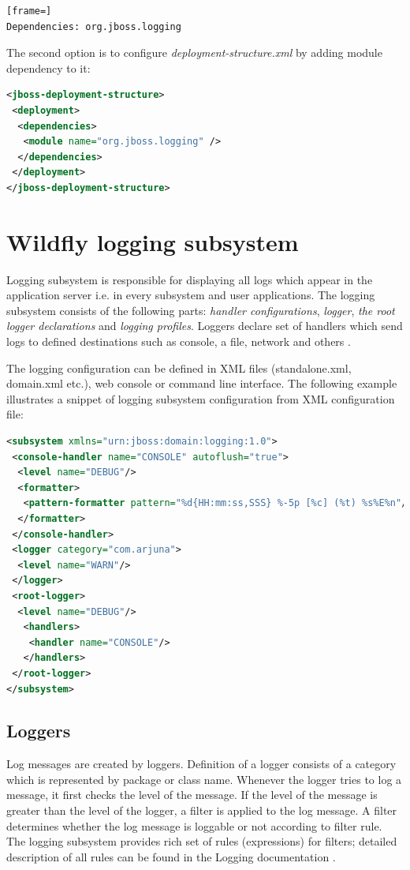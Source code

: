 \documentclass[12pt,oneside]{fithesis2}
\begin{document}
\begin{lstlisting}[frame=]
Dependencies: org.jboss.logging
\end{lstlisting}

\newpage
The second option is to configure \textit{deployment-structure.xml} by adding module dependency to it:

\begin{lstlisting}[caption = Configuring deployment structure file, label = dynamic_module_descriptor, language=XML]
<jboss-deployment-structure>
 <deployment>
  <dependencies>
   <module name="org.jboss.logging" />
  </dependencies>
 </deployment>
</jboss-deployment-structure>
\end{lstlisting}

\section{Wildfly logging subsystem}
\label{wildfly_logging}
Logging subsystem is responsible for displaying all logs which appear in the application server i.e. in every subsystem and user applications. The logging subsystem consists of the following parts: \textit{handler configurations}, \textit{logger}, \textit{the root logger declarations} and \textit{logging profiles}. Loggers declare set of handlers which send logs to defined destinations such as console, a file, network and others \cite[Logging Configuration]{wildfly_doc}.

The logging configuration can be defined in XML files (standalone.xml, domain.xml etc.), web console or command line interface. The following example illustrates a snippet of logging subsystem configuration from XML configuration file:

\begin{lstlisting}[caption = Configuring logging subsystem, label = logging_subsystem, language=XML]
<subsystem xmlns="urn:jboss:domain:logging:1.0">
 <console-handler name="CONSOLE" autoflush="true">
  <level name="DEBUG"/>
  <formatter>
   <pattern-formatter pattern="%d{HH:mm:ss,SSS} %-5p [%c] (%t) %s%E%n"/>
  </formatter>
 </console-handler>
 <logger category="com.arjuna">
  <level name="WARN"/>
 </logger>
 <root-logger>
  <level name="DEBUG"/>
   <handlers>
    <handler name="CONSOLE"/>
   </handlers>
 </root-logger>
</subsystem>
\end{lstlisting}

\subsection{Loggers}
Log messages are created by loggers. Definition of a logger consists of a category which is represented by package or class name. Whenever the logger tries to log a message, it first checks the level of the message. If the level of the message is greater than the level of the logger, a filter is applied to the log message.  A filter determines whether the log message is loggable or not according to filter rule. The logging subsystem provides rich set of rules (expressions) for filters; detailed description of all rules can be found in the Logging documentation \cite[Logging Configuration]{wildfly_doc}.
\end{document}
